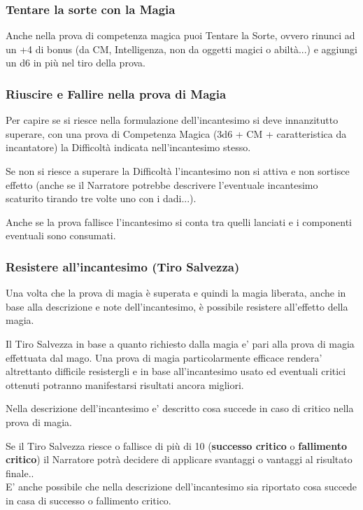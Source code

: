 \subsubsection{Tentare la sorte con la Magia}

Anche nella prova di competenza magica puoi Tentare la Sorte, ovvero rinunci ad un +4 di bonus (da CM, Intelligenza, non da oggetti magici o abiltà...) e aggiungi un d6 in più nel tiro della prova.

\subsubsection{Riuscire e Fallire nella prova di Magia}

Per capire se si riesce nella formulazione dell'incantesimo si deve innanzitutto superare, con una prova di Competenza Magica (3d6 + CM + caratteristica da incantatore) la Difficoltà indicata nell'incantesimo stesso.

Se non si riesce a superare la Difficoltà l'incantesimo non si attiva e non sortisce effetto (anche se il Narratore potrebbe descrivere l'eventuale incantesimo scaturito tirando tre volte uno con i dadi...).

Anche se la prova fallisce l'incantesimo si conta tra quelli lanciati e i componenti eventuali sono consumati.

\subsubsection{Resistere all'incantesimo (Tiro Salvezza)}

\label{resistere-allessenza-tiro-salvezza}

Una volta che la prova di magia è superata e quindi la magia liberata, anche in base alla descrizione e note dell'incantesimo, è possibile resistere all'effetto della magia.

Il Tiro Salvezza in base a quanto richiesto dalla magia e' pari alla prova di magia effettuata dal mago. Una prova di magia particolarmente efficace rendera' altrettanto difficile resistergli e in base all'incantesimo usato ed eventuali critici ottenuti potranno manifestarsi risultati ancora migliori.

Nella descrizione dell'incantesimo e' descritto cosa succede in caso di critico nella prova di magia.

Se il Tiro Salvezza riesce o fallisce di più di 10 (\textbf{successo critico} o \textbf{fallimento critico}) il Narratore potrà decidere di applicare svantaggi o vantaggi al risultato finale..\\
E' anche possibile che nella descrizione dell'incantesimo sia riportato cosa succede in casa di successo o fallimento critico.

